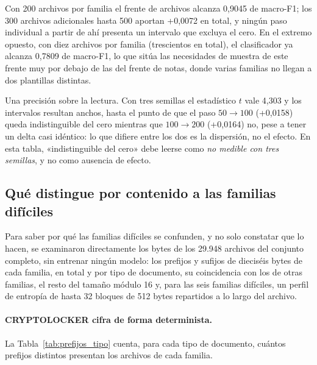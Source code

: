 Con 200 archivos por familia el frente de archivos alcanza 0,9045 de macro-F1; los 300 archivos adicionales hasta 500 aportan +0,0072 en total, y ningún paso individual a partir de ahí presenta un intervalo que excluya el cero. En el extremo opuesto, con diez archivos por familia (trescientos en total), el clasificador ya alcanza 0,7809 de macro-F1, lo que sitúa las necesidades de muestra de este frente muy por debajo de las del frente de notas, donde varias familias no llegan a dos plantillas distintas.

Una precisión sobre la lectura. Con tres semillas el estadístico $t$ vale 4,303 y los intervalos resultan anchos, hasta el punto de que el paso $50\to100$ (+0,0158) queda indistinguible del cero mientras que $100\to200$ (+0,0164) no, pese a tener un delta casi idéntico: lo que difiere entre los dos es la dispersión, no el efecto. En esta tabla, «indistinguible del cero» debe leerse como \textit{no medible con tres semillas}, y no como ausencia de efecto.

\subsection{Qué distingue por contenido a las familias difíciles}
\label{subsec:exp2c_determinista}

Para saber por qué las familias difíciles se confunden, y no solo constatar que lo hacen, se examinaron directamente los bytes de los 29.948 archivos del conjunto completo, sin entrenar ningún modelo: los prefijos y sufijos de dieciséis bytes de cada familia, en total y por tipo de documento, su coincidencia con los de otras familias, el resto del tamaño módulo 16 y, para las seis familias difíciles, un perfil de entropía de hasta 32 bloques de 512 bytes repartidos a lo largo del archivo.

\paragraph{CRYPTOLOCKER cifra de forma determinista.} La Tabla~\ref{tab:prefijos_tipo} cuenta, para cada tipo de documento, cuántos prefijos distintos presentan los archivos de cada familia.

